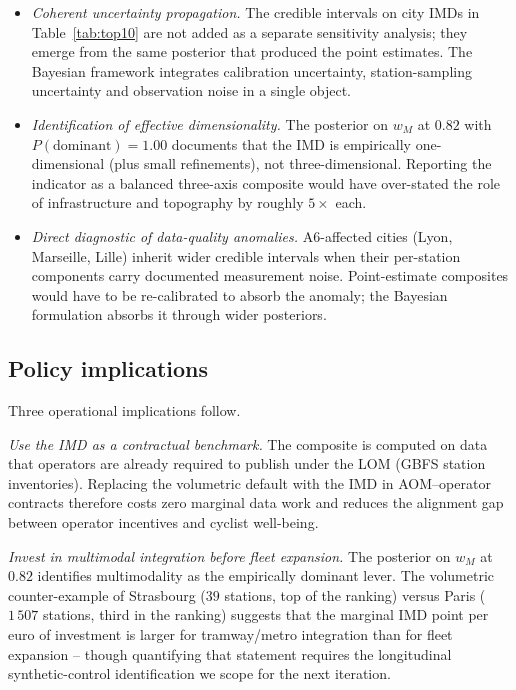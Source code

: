 \documentclass[11pt,a4paper]{article}
\begin{document}
\begin{itemize}
\item \emph{Coherent uncertainty propagation.} The credible
intervals on city IMDs in Table~\ref{tab:top10} are not added
as a separate sensitivity analysis; they emerge from the same
posterior that produced the point estimates. The Bayesian
framework integrates calibration uncertainty, station-sampling
uncertainty and observation noise in a single object.
\item \emph{Identification of effective dimensionality.}
The posterior on $w_M$ at $0.82$ with $P(\text{dominant}) =
1.00$ documents that the IMD is empirically one-dimensional
(plus small refinements), not three-dimensional. Reporting the
indicator as a balanced three-axis composite would have
over-stated the role of infrastructure and topography by
roughly $5\times$ each.
\item \emph{Direct diagnostic of data-quality anomalies.}
A6-affected cities (Lyon, Marseille, Lille) inherit wider
credible intervals when their per-station components carry
documented measurement noise. Point-estimate composites would
have to be re-calibrated to absorb the anomaly; the Bayesian
formulation absorbs it through wider posteriors.
\end{itemize}

\subsection{Policy implications}

Three operational implications follow.

\emph{Use the IMD as a contractual benchmark.}
The composite is computed on data that operators are already
required to publish under the LOM (GBFS station inventories).
Replacing the volumetric default with the IMD in AOM--operator
contracts therefore costs zero marginal data work and reduces
the alignment gap between operator incentives and cyclist
well-being.

\emph{Invest in multimodal integration before fleet expansion.}
The posterior on $w_M$ at $0.82$ identifies multimodality as
the empirically dominant lever. The volumetric counter-example
of Strasbourg ($39$ stations, top of the ranking) versus Paris
($1\,507$ stations, third in the ranking) suggests that the
marginal IMD point per euro of investment is larger for
tramway/metro integration than for fleet expansion -- though
quantifying that statement requires the longitudinal
synthetic-control identification we scope for the next
iteration.
\end{document}
